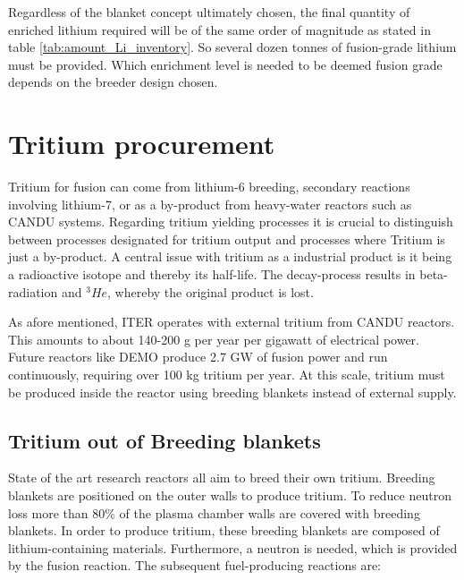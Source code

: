     Regardless of the blanket concept ultimately chosen, the final quantity of enriched lithium required will be of the same order of magnitude as stated in table \ref{tab:amount_Li_inventory}. So several dozen tonnes of fusion-grade lithium must be provided. Which enrichment level is needed to be deemed fusion grade depends on the breeder design chosen. \cite{giegerich2019lithium6} %

\section{Tritium procurement} 
\label{sec_tritium_procurement}
Tritium for fusion can come from lithium-6 breeding, secondary reactions involving lithium-7, or as a by-product from heavy-water reactors such as CANDU systems.
Regarding tritium yielding processes it is crucial to distinguish between processes designated for tritium output and processes where Tritium is just a by-product.
A central issue with tritium as a industrial product is it being a radioactive isotope and thereby its half-life. The decay-process results in beta-radiation and ${}^3He$, whereby the original product is lost.  \cite{AcostaFlexer2018}

As afore mentioned, ITER operates with external tritium from CANDU reactors. This amounts to about 140-200 g per year per gigawatt of electrical power. Future reactors like DEMO produce 2.7 GW of fusion power and run continuously, requiring over 100 kg tritium per year. At this scale, tritium must be produced inside the reactor using breeding blankets instead of external supply. \cite{IAEA2018FusionDemo}

    \subsection{Tritium out of Breeding blankets} 
    \label{subsec_tritium_breeding_blankets}
    State of the art research reactors all aim to breed their own tritium. Breeding blankets are positioned on the outer walls to produce tritium. \cite{giegerich2019lithium6}
    To reduce neutron loss more than 80\% of the plasma chamber walls are covered with breeding blankets. \cite{IAEA2018FusionDemo}
    In order to produce tritium, these breeding blankets are composed of lithium-containing materials. Furthermore, a neutron is needed, which is provided by the fusion reaction.
    The subsequent fuel-producing reactions are: \cite{giegerich2019lithium6}

